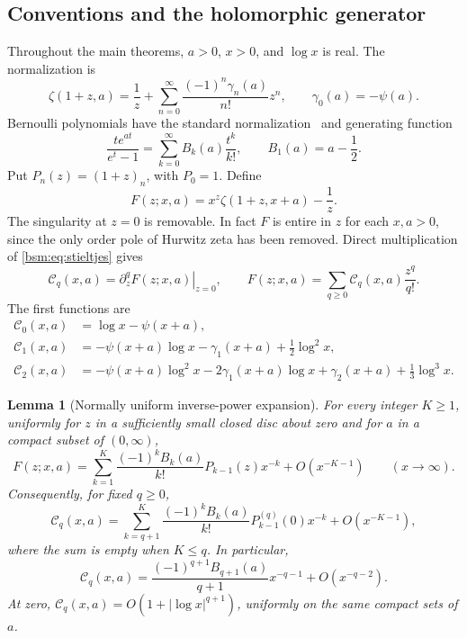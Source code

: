 \documentclass[11pt,letterpaper]{article}
\numberwithin{equation}{section}
\newtheorem{lemma}[theorem]{Lemma}
\theoremstyle{definition}\newtheorem{definition}[theorem]{Definition}
\theoremstyle{remark}\newtheorem{remark}[theorem]{Remark}
\newcommand{\Ccal}{\mathcal C}
\begin{document}
\subsection{Conventions and the holomorphic generator}
Throughout the main theorems, $a>0$, $x>0$, and $\log x$ is real.
The normalization is
\begin{equation}\label{bsm:eq:stieltjes}
 \zeta(1+z,a)=\frac1z+
             \sum_{n=0}^\infty\frac{(-1)^n\gamma_n(a)}{n!}z^n,
 \qquad \gamma_0(a)=-\psi(a).
\end{equation}
Bernoulli polynomials have the standard normalization~\cite{DLMFBernoulli}
and generating function
\begin{equation}\label{bsm:eq:bernoulli-generator}
 \frac{t e^{at}}{e^t-1}=\sum_{k=0}^\infty B_k(a)\frac{t^k}{k!},
 \qquad B_1(a)=a-\frac12.
\end{equation}
Put $P_n(z)=(1+z)_n$, with $P_0=1$. Define
\begin{equation}\label{bsm:eq:F}
 F(z;x,a)=x^z\zeta(1+z,x+a)-\frac1z.
\end{equation}
The singularity at $z=0$ is removable. In fact $F$ is entire in $z$
for each $x,a>0$, since the only order pole of Hurwitz zeta has been
removed. Direct multiplication of \eqref{bsm:eq:stieltjes} gives
\begin{equation}\label{bsm:eq:C-generator}
 \Ccal_q(x,a)=\left.\partial_z^qF(z;x,a)\right|_{z=0},
 \qquad F(z;x,a)=\sum_{q\ge0}\Ccal_q(x,a)\frac{z^q}{q!}.
\end{equation}
The first functions are
\begin{align}
 \Ccal_0(x,a)&=\log x-\psi(x+a),\label{bsm:eq:C0}\\
 \Ccal_1(x,a)&=-\psi(x+a)\log x-\gamma_1(x+a)
                                      +\tfrac12\log^2x,\label{bsm:eq:C1}\\
 \Ccal_2(x,a)&=-\psi(x+a)\log^2x-2\gamma_1(x+a)\log x
                          +\gamma_2(x+a)+\tfrac13\log^3x.\label{bsm:eq:C2}
\end{align}

\begin{lemma}[Normally uniform inverse-power expansion]\label{bsm:lem:tail}
For every integer $K\ge1$, uniformly for $z$ in a sufficiently small
closed disc about zero and for $a$ in a compact subset of $(0,\infty)$,
\begin{equation}\label{bsm:eq:F-tail}
 F(z;x,a)=\sum_{k=1}^{K}
       \frac{(-1)^k B_k(a)}{k!}P_{k-1}(z)x^{-k}
                       +O(x^{-K-1})\qquad(x\longrightarrow\infty).
\end{equation}
Consequently, for fixed $q\ge0$,
\begin{equation}\label{bsm:eq:C-tail}
 \Ccal_q(x,a)=\sum_{k=q+1}^{K}
       \frac{(-1)^k B_k(a)}{k!}P_{k-1}^{(q)}(0)x^{-k}
                       +O(x^{-K-1}),
\end{equation}
where the sum is empty when $K\le q$. In particular,
\begin{equation}\label{bsm:eq:leading-tail}
 \Ccal_q(x,a)=\frac{(-1)^{q+1}B_{q+1}(a)}{q+1}x^{-q-1}
                              +O(x^{-q-2}).
\end{equation}
At zero, $\Ccal_q(x,a)=O(1+|\log x|^{q+1})$, uniformly on the same
compact sets of $a$.
\end{lemma}
\end{document}
